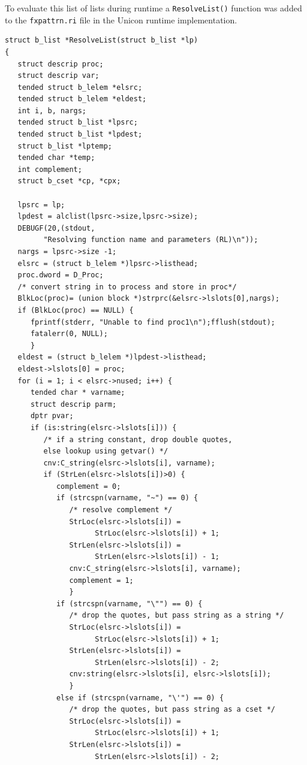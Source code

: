 \documentclass{article}
\begin{document}
To evaluate this list of lists during runtime a \texttt{ResolveList()} function was added to the \texttt{fxpattrn.ri} file in the Unicon runtime implementation.  
\begin{verbatim}
struct b_list *ResolveList(struct b_list *lp)
{
   struct descrip proc;
   struct descrip var;
   tended struct b_lelem *elsrc;
   tended struct b_lelem *eldest;
   int i, b, nargs;
   tended struct b_list *lpsrc;
   tended struct b_list *lpdest;
   struct b_list *lptemp;
   tended char *temp;
   int complement;
   struct b_cset *cp, *cpx;

   lpsrc = lp;
   lpdest = alclist(lpsrc->size,lpsrc->size);
   DEBUGF(20,(stdout, 
         "Resolving function name and parameters (RL)\n"));
   nargs = lpsrc->size -1;
   elsrc = (struct b_lelem *)lpsrc->listhead;
   proc.dword = D_Proc;
   /* convert string in to process and store in proc*/
   BlkLoc(proc)= (union block *)strprc(&elsrc->lslots[0],nargs);
   if (BlkLoc(proc) == NULL) {
      fprintf(stderr, "Unable to find proc1\n");fflush(stdout);
      fatalerr(0, NULL);
      }
   eldest = (struct b_lelem *)lpdest->listhead;
   eldest->lslots[0] = proc;
   for (i = 1; i < elsrc->nused; i++) {
      tended char * varname;
      struct descrip parm;
      dptr pvar;
      if (is:string(elsrc->lslots[i])) {
         /* if a string constant, drop double quotes,
         else lookup using getvar() */
         cnv:C_string(elsrc->lslots[i], varname);
         if (StrLen(elsrc->lslots[i])>0) {
            complement = 0;
            if (strcspn(varname, "~") == 0) {
               /* resolve complement */
               StrLoc(elsrc->lslots[i]) =
                     StrLoc(elsrc->lslots[i]) + 1;
               StrLen(elsrc->lslots[i]) = 
                     StrLen(elsrc->lslots[i]) - 1;
               cnv:C_string(elsrc->lslots[i], varname);
               complement = 1;
               }
            if (strcspn(varname, "\"") == 0) {
               /* drop the quotes, but pass string as a string */
               StrLoc(elsrc->lslots[i]) = 
                     StrLoc(elsrc->lslots[i]) + 1;
               StrLen(elsrc->lslots[i]) = 
                     StrLen(elsrc->lslots[i]) - 2;
               cnv:string(elsrc->lslots[i], elsrc->lslots[i]);
               }
            else if (strcspn(varname, "\'") == 0) { 
               /* drop the quotes, but pass string as a cset */
               StrLoc(elsrc->lslots[i]) = 
                     StrLoc(elsrc->lslots[i]) + 1;
               StrLen(elsrc->lslots[i]) = 
                     StrLen(elsrc->lslots[i]) - 2;

\end{verbatim}
\end{document}
